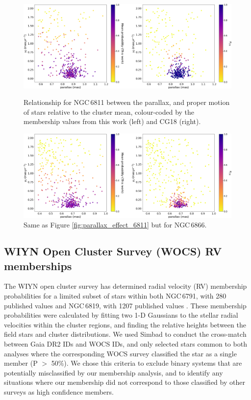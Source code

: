 \begin{figure}[tpb]
    \centering
    \includegraphics[width=\linewidth]{Chapter4/NGC6811_CG_comparison_parallax_all.png}
    \caption[Impact of parallax inclusion in membership analysis - NGC\,6811]{Relationship for NGC\,6811 between the parallax, and proper motion of stars relative to the cluster mean, colour-coded by the membership values from this work (left) and CG18 (right).}
    \label{fig:parallax_effect_6811}
    \vspace{0.5cm}
    \includegraphics[width=\linewidth]{Chapter4/NGC6866_CG_comparison_parallax_all.png}
    \caption[Impact of parallax inclusion in membership analysis - NGC\,6866]{Same as Figure \ref{fig:parallax_effect_6811} but for NGC\,6866.}
    \label{fig:parallax_effect_6866}
\end{figure}

\subsection{WIYN Open Cluster Survey (WOCS) RV memberships}

The WIYN open cluster survey \citep{mathieu_wiyn_2000} has determined radial velocity (RV) membership probabilities for a limited subset of stars within both NGC\,6791, with 280 published values \citep{tofflemire_wiyn_2014} and NGC\,6819, with 1207 published values \citep{hole_wiyn_2009}. These membership probabilities were calculated by fitting two 1-D Gaussians to the stellar radial velocities within the cluster regions, and finding the relative heights between the field stars and cluster distributions. We used Simbad \citep{wenger_simbad_2000} to conduct the cross-match between Gaia DR2 IDs and WOCS IDs, and only selected stars common to both analyses where the corresponding WOCS survey classified the star as a single member (P $>$ 50\%). We chose this criteria to exclude binary systems that are potentially misclassified by our membership analysis, and to identify any situations where our membership did not correspond to those classified by other surveys as high confidence members. 


